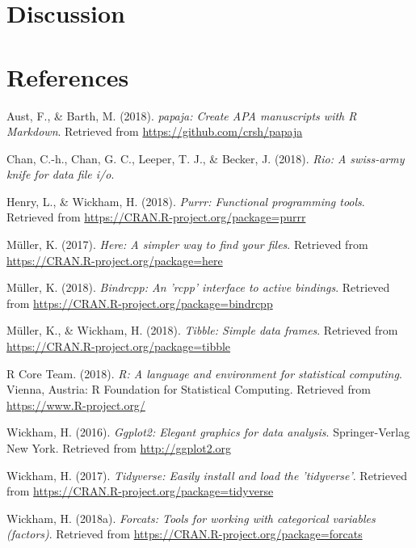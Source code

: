 \documentclass[man]{apa6}
\begin{document}
\section{Discussion}\label{discussion}

\newpage

\section{References}\label{references}

\begingroup
\setlength{\parindent}{-0.5in} \setlength{\leftskip}{0.5in}

\hypertarget{refs}{}
\hypertarget{ref-R-papaja}{}
Aust, F., \& Barth, M. (2018). \emph{papaja: Create APA manuscripts with
R Markdown}. Retrieved from \url{https://github.com/crsh/papaja}

\hypertarget{ref-R-rio}{}
Chan, C.-h., Chan, G. C., Leeper, T. J., \& Becker, J. (2018).
\emph{Rio: A swiss-army knife for data file i/o}.

\hypertarget{ref-R-purrr}{}
Henry, L., \& Wickham, H. (2018). \emph{Purrr: Functional programming
tools}. Retrieved from \url{https://CRAN.R-project.org/package=purrr}

\hypertarget{ref-R-here}{}
Müller, K. (2017). \emph{Here: A simpler way to find your files}.
Retrieved from \url{https://CRAN.R-project.org/package=here}

\hypertarget{ref-R-bindrcpp}{}
Müller, K. (2018). \emph{Bindrcpp: An 'rcpp' interface to active
bindings}. Retrieved from
\url{https://CRAN.R-project.org/package=bindrcpp}

\hypertarget{ref-R-tibble}{}
Müller, K., \& Wickham, H. (2018). \emph{Tibble: Simple data frames}.
Retrieved from \url{https://CRAN.R-project.org/package=tibble}

\hypertarget{ref-R-base}{}
R Core Team. (2018). \emph{R: A language and environment for statistical
computing}. Vienna, Austria: R Foundation for Statistical Computing.
Retrieved from \url{https://www.R-project.org/}

\hypertarget{ref-R-ggplot2}{}
Wickham, H. (2016). \emph{Ggplot2: Elegant graphics for data analysis}.
Springer-Verlag New York. Retrieved from \url{http://ggplot2.org}

\hypertarget{ref-R-tidyverse}{}
Wickham, H. (2017). \emph{Tidyverse: Easily install and load the
'tidyverse'}. Retrieved from
\url{https://CRAN.R-project.org/package=tidyverse}

\hypertarget{ref-R-forcats}{}
Wickham, H. (2018a). \emph{Forcats: Tools for working with categorical
variables (factors)}. Retrieved from
\url{https://CRAN.R-project.org/package=forcats}
\end{document}
